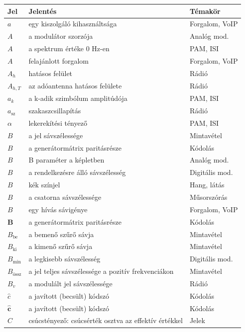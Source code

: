 {\small\renewcommand{\arraystretch}{1.2}\begin{longtable}{@{}>{\raggedright\arraybackslash}p{2.4cm}>{\raggedright\arraybackslash}p{8.2cm}>{\raggedright\arraybackslash}p{3.8cm}@{}}\toprule
\textbf{Jel} & \textbf{Jelentés} & \textbf{Témakör}\\\midrule\endhead
$a$ & egy kiszolgáló kihasználtsága & Forgalom, VoIP\\
$A$ & a modulátor szorzója & Analóg mod.\\
$A$ & a spektrum értéke 0 Hz-en & PAM, ISI\\
$A$ & felajánlott forgalom & Forgalom, VoIP\\
$A_h$ & hatásos felület & Rádió\\
$A_{h,T}$ & az adóantenna hatásos felülete & Rádió\\
$a_k$ & a k-adik szimbólum amplitúdója & PAM, ISI\\
$a_\mathrm{sz}$ & szakaszcsillapítás & Rádió\\
$\alpha$ & lekerekítési tényező & PAM, ISI\\
$B$ & a jel sávszélessége & Mintavétel\\
$B$ & a generátormátrix paritásrésze & Kódolás\\
$B$ & B paraméter a képletben & Analóg mod.\\
$B$ & a rendelkezésre álló sávszélesség & Digitális mod.\\
$B$ & kék színjel & Hang, látás\\
$B$ & a csatorna sávszélessége & Műsorszórás\\
$B$ & egy hívás sávigénye & Forgalom, VoIP\\
$\mathbf B$ & a generátormátrix paritásrésze & Kódolás\\
$B_\text{be}$ & a bemenő szűrő sávja & Mintavétel\\
$B_\text{ki}$ & a kimenő szűrő sávja & Mintavétel\\
$B_{\min}$ & a legkisebb sávszélesség & Digitális mod.\\
$B_\text{össz}$ & a jel teljes sávszélessége a pozitív frekvenciákon & Mintavétel\\
$B_v$ & a modulált jel sávszélessége & Rádió\\
$\hat c$ & a javított (becsült) kódszó & Kódolás\\
$\hat{\mathbf c}$ & a javított (becsült) kódszó & Kódolás\\
$C$ & csúcstényező: csúcsérték osztva az effektív értékkel & Jelek\\

\end{longtable}}
